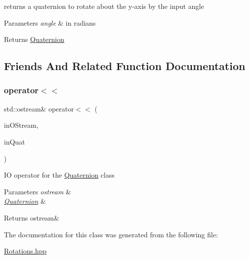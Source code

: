 returns a quaternion to rotate about the y-\/axis by the input angle


\begin{DoxyParams}{Parameters}
{\em angle} & in radians \\
\hline
\end{DoxyParams}
\begin{DoxyReturn}{Returns}
\mbox{\hyperlink{class_num_cpp_1_1_rotations_1_1_quaternion}{Quaternion}} 
\end{DoxyReturn}


\subsection{Friends And Related Function Documentation}
\mbox{\label{class_num_cpp_1_1_rotations_1_1_quaternion_a6d11f3a719f010cdd220642d2bb586e6}} 
\subsubsection{\texorpdfstring{operator$<$$<$}{operator<<}}
{\footnotesize\ttfamily std\+::ostream\& operator$<$$<$ (\begin{DoxyParamCaption}\item[{std\+::ostream \&}]{in\+O\+Stream,  }\item[{const \mbox{\hyperlink{class_num_cpp_1_1_rotations_1_1_quaternion}{Quaternion}} \&}]{in\+Quat }\end{DoxyParamCaption})\hspace{0.3cm}{\ttfamily [friend]}}

IO operator for the \mbox{\hyperlink{class_num_cpp_1_1_rotations_1_1_quaternion}{Quaternion}} class


\begin{DoxyParams}{Parameters}
{\em ostream} & \\
\hline
{\em \mbox{\hyperlink{class_num_cpp_1_1_rotations_1_1_quaternion}{Quaternion}}} & \\
\hline
\end{DoxyParams}
\begin{DoxyReturn}{Returns}
ostream\& 
\end{DoxyReturn}


The documentation for this class was generated from the following file\+:\begin{DoxyCompactItemize}
\item 
\mbox{\hyperlink{_rotations_8hpp}{Rotations.\+hpp}}\end{DoxyCompactItemize}
